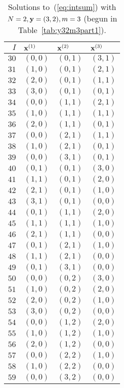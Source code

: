 \documentclass{article}
\begin{document}
\begin{twocolumn}
\begin{table}
\begin{center}
\begin{tabular}{r|lll}
$I$ & ${\bf x}^{(1)}$ & ${\bf x}^{(2)}$ & ${\bf x}^{(3)}$
\\ \hline
$30$ & $(0,0)$ & $(0,1)$ & $(3,1)$ \\
$31$ & $(1,0)$ & $(0,1)$ & $(2,1)$ \\
$32$ & $(2,0)$ & $(0,1)$ & $(1,1)$ \\
$33$ & $(3,0)$ & $(0,1)$ & $(0,1)$ \\
$34$ & $(0,0)$ & $(1,1)$ & $(2,1)$ \\
$35$ & $(1,0)$ & $(1,1)$ & $(1,1)$ \\
$36$ & $(2,0)$ & $(1,1)$ & $(0,1)$ \\
$37$ & $(0,0)$ & $(2,1)$ & $(1,1)$ \\
$38$ & $(1,0)$ & $(2,1)$ & $(0,1)$ \\
$39$ & $(0,0)$ & $(3,1)$ & $(0,1)$
\\
$40$ & $(0,1)$ & $(0,1)$ & $(3,0)$ \\
$41$ & $(1,1)$ & $(0,1)$ & $(2,0)$ \\
$42$ & $(2,1)$ & $(0,1)$ & $(1,0)$ \\
$43$ & $(3,1)$ & $(0,1)$ & $(0,0)$ \\
$44$ & $(0,1)$ & $(1,1)$ & $(2,0)$ \\
$45$ & $(1,1)$ & $(1,1)$ & $(1,0)$ \\
$46$ & $(2,1)$ & $(1,1)$ & $(0,0)$ \\
$47$ & $(0,1)$ & $(2,1)$ & $(1,0)$ \\
$48$ & $(1,1)$ & $(2,1)$ & $(0,0)$ \\
$49$ & $(0,1)$ & $(3,1)$ & $(0,0)$
\\
$50$ & $(0,0)$ & $(0,2)$ & $(3,0)$ \\
$51$ & $(1,0)$ & $(0,2)$ & $(2,0)$ \\
$52$ & $(2,0)$ & $(0,2)$ & $(1,0)$ \\
$53$ & $(3,0)$ & $(0,2)$ & $(0,0)$ \\
$54$ & $(0,0)$ & $(1,2)$ & $(2,0)$ \\
$55$ & $(1,0)$ & $(1,2)$ & $(1,0)$ \\
$56$ & $(2,0)$ & $(1,2)$ & $(0,0)$ \\
$57$ & $(0,0)$ & $(2,2)$ & $(1,0)$ \\
$58$ & $(1,0)$ & $(2,2)$ & $(0,0)$ \\
$59$ & $(0,0)$ & $(3,2)$ & $(0,0)$
\end{tabular}
\end{center}
\caption{
\label{tab:y32m3part2}
Solutions to~(\ref{eq:intsum}) with $N=2, {\bf y}=(3,2), m=3$
(begun in Table~\ref{tab:y32m3part1}).
}
\end{table}

\end{twocolumn}

\newpage
\end{document}
